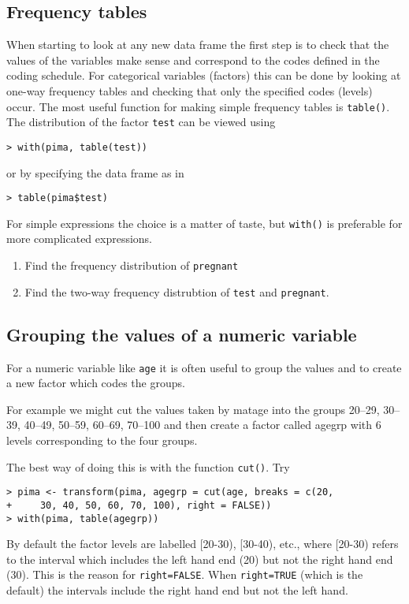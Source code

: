 \documentclass[12pt]{article}
\begin{document}
\subsection{Frequency tables}

When starting to look at any new data frame the first step is to check that the values of the variables make sense and correspond to the codes defined in the coding schedule. For categorical
variables (factors) this can be done by looking at one-way frequency tables and checking that only
the specified codes (levels) occur. The most useful function for making simple frequency tables is \texttt{table()}. The distribution of the factor \texttt{test} can be viewed using
\begin{verbatim}
> with(pima, table(test))
\end{verbatim}
or by specifying the data frame as in
\begin{verbatim}
> table(pima$test)
\end{verbatim}
For simple expressions the choice is a matter of taste, but \texttt{with()} is preferable for more complicated expressions.

\begin{enumerate}
\item Find the frequency distribution of \texttt{pregnant}
\item Find the two-way frequency distrubtion of \texttt{test} and \texttt{pregnant}.
\end{enumerate}

\subsection{Grouping the values of a numeric variable}

For a numeric variable like \texttt{age} it is often useful to group the values and to create a new factor which codes the groups. 

For example we might cut the values taken by matage into the groups
20--29, 30--39, 40--49, 50--59, 60--69, 70--100 and then create a factor called agegrp with 6 levels corresponding to the four groups. 

The best way of doing this is with the function \texttt{cut()}. Try
\begin{verbatim}
> pima <- transform(pima, agegrp = cut(age, breaks = c(20,
+     30, 40, 50, 60, 70, 100), right = FALSE))
> with(pima, table(agegrp))
\end{verbatim}
By default the factor levels are labelled [20-30), [30-40), etc., where [20-30) refers to the interval which includes the left hand end (20) but not the right hand end (30). This is the reason for \texttt{right=FALSE}. When \texttt{right=TRUE} (which is the default) the intervals include the right hand end but not the left hand.
\end{document}

